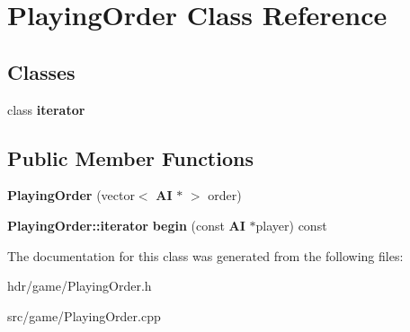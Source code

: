 \section{Playing\-Order Class Reference}
\label{class_playing_order}
\subsection*{Classes}
\begin{DoxyCompactItemize}
\item 
class {\bf iterator}
\end{DoxyCompactItemize}
\subsection*{Public Member Functions}
\begin{DoxyCompactItemize}
\item 
{\bfseries Playing\-Order} (vector$<$ {\bf A\-I} $\ast$ $>$ order)\label{class_playing_order_a24bd2c8773f4b26bcd830f6861a3b8da}

\item 
{\bf Playing\-Order\-::iterator} {\bfseries begin} (const {\bf A\-I} $\ast$player) const \label{class_playing_order_a76cd302aa4aeb5f1d3573eb3b9dfabff}

\end{DoxyCompactItemize}


The documentation for this class was generated from the following files\-:\begin{DoxyCompactItemize}
\item 
hdr/game/Playing\-Order.\-h\item 
src/game/Playing\-Order.\-cpp\end{DoxyCompactItemize}
